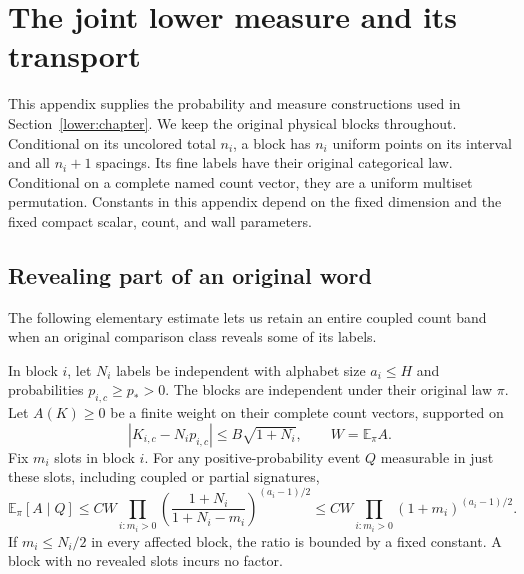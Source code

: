\section{The joint lower measure and its transport}
\label{app:lower-details}

This appendix supplies the probability and measure constructions used in
Section~\ref{lower:chapter}.  We keep the original physical blocks
throughout.  Conditional on its uncolored total \(n_i\), a block has
\(n_i\) uniform points on its interval and all \(n_i+1\) spacings.
Its fine labels have their original categorical law.  Conditional on
a complete named count vector, they are a uniform multiset permutation.
Constants in this appendix depend on the fixed dimension and the fixed
compact scalar, count, and wall parameters.

\subsection{Revealing part of an original word}

The following elementary estimate lets us retain an entire coupled
count band when an original comparison class reveals some of its labels.

\begin{lemma}
\label{ld:reveal}
In block \(i\), let \(N_i\) labels be independent with alphabet size
\(a_i\le H\) and probabilities \(p_{i,c}\ge p_*>0\).  The blocks are
independent under their original law \(\pi\).  Let \(A(K)\ge0\) be
a finite weight on their complete count vectors, supported on
\[
 |K_{i,c}-N_ip_{i,c}|\le B\sqrt{1+N_i},
 \qquad W=\mathbb E_\pi A.
\]
Fix \(m_i\) slots in block \(i\).  For any positive-probability event
\(Q\) measurable in just these slots, including coupled or partial
signatures,
\begin{equation}
 \mathbb E_\pi[A\mid Q]\le CW
 \prod_{i:m_i>0}
 \left(\frac{1+N_i}{1+N_i-m_i}\right)^{(a_i-1)/2}
 \le CW\prod_{i:m_i>0}(1+m_i)^{(a_i-1)/2}.
 \label{ld:reveal-bound}
\end{equation}
If \(m_i\le N_i/2\) in every affected block, the ratio is bounded
by a fixed constant.  A block with no revealed slots incurs no factor.
\end{lemma}

